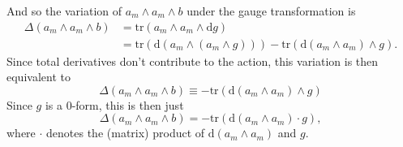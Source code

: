 \documentclass{article}
\begin{document}
And so the variation of $a_{m}\wedge a_{m}\wedge b$ under the gauge transformation is
\begin{align}
    \Delta\left(a_{m}\wedge a_{m}\wedge b\right) &= \text{tr}\left(a_{m}\wedge a_{m}\wedge \mathrm{d}g \right)\\
    &= \text{tr}\left(\mathrm{d}\left(a_{m}\wedge \left(a_{m}\wedge g\right)\right)\right) - \text{tr}\left(\mathrm{d}\left(a_{m}\wedge a_{m}\right)\wedge g\right).
\end{align}
Since total derivatives don't contribute to the action, this variation is then equivalent to
\begin{equation}
    \Delta\left(a_{m}\wedge a_{m}\wedge b\right) \equiv - \text{tr}\left(\mathrm{d}\left(a_{m}\wedge a_{m}\right)\wedge g\right)
\end{equation}
Since $g$ is a 0-form, this is then just
\begin{equation}
    \Delta\left(a_{m}\wedge a_{m}\wedge b\right) = - \text{tr}\left(\mathrm{d}\left(a_{m}\wedge a_{m}\right)\cdot g\right),
\end{equation}
where $\cdot$ denotes the (matrix) product of $\mathrm{d}\left(a_{m}\wedge a_{m}\right)$ and $g$. 
\end{document}
